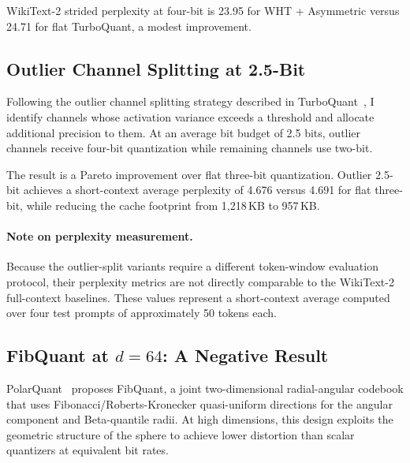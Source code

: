WikiText-2 strided perplexity at four-bit is 23.95 for WHT + Asymmetric
versus 24.71 for flat TurboQuant, a modest improvement.

\subsection{Outlier Channel Splitting at 2.5-Bit}
\label{sec:method:outlier}

Following the outlier channel splitting strategy described in
TurboQuant~\cite{zandieh2025turboquant}, I identify channels whose
activation variance exceeds a threshold and allocate additional precision
to them.
At an average bit budget of 2.5 bits, outlier channels receive four-bit
quantization while remaining channels use two-bit.

The result is a Pareto improvement over flat three-bit quantization.
Outlier 2.5-bit achieves a short-context average perplexity of 4.676
versus 4.691 for flat three-bit, while reducing the cache footprint from
1{,}218\,KB to 957\,KB.

\paragraph{Note on perplexity measurement.}
Because the outlier-split variants require a different token-window evaluation protocol, their perplexity metrics are not directly comparable to the WikiText-2 full-context baselines. These values represent a short-context average computed over four test prompts of approximately 50 tokens each.

\subsection{FibQuant at \texorpdfstring{$d = 64$}{d=64}: A Negative Result}
\label{sec:method:fibquant}

PolarQuant~\cite{han2025polarquant} proposes FibQuant, a joint
two-dimensional radial-angular codebook that uses
Fibonacci/Roberts-Kronecker quasi-uniform directions for the angular
component and Beta-quantile radii.
At high dimensions, this design exploits the geometric structure of
the sphere to achieve lower distortion than scalar quantizers at
equivalent bit rates.

